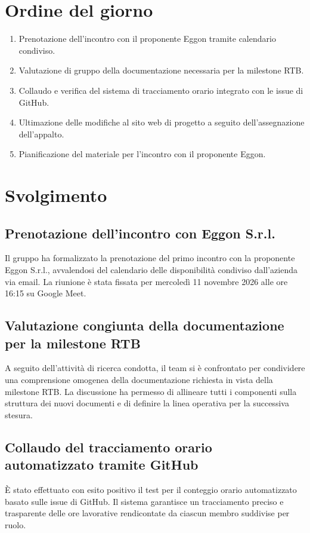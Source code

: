 \documentclass[interno]{gpt}
\begin{document}
\section{Ordine del giorno}
\begin{enumerate}
  \item Prenotazione dell'incontro con il proponente Eggon tramite calendario condiviso.
  \item Valutazione di gruppo della documentazione necessaria per la milestone RTB.
  \item Collaudo e verifica del sistema di tracciamento orario integrato con le issue di GitHub.
  \item Ultimazione delle modifiche al sito web di progetto a seguito dell'assegnazione dell'appalto.
  \item Pianificazione del materiale per l'incontro con il proponente Eggon.
\end{enumerate}

\clearpage

\section{Svolgimento}

\subsection{Prenotazione dell'incontro con Eggon S.r.l.}
Il gruppo ha formalizzato la prenotazione del primo incontro con la proponente Eggon S.r.l., avvalendosi del calendario delle disponibilità condiviso dall'azienda via email. La riunione è stata fissata per mercoledì 11 novembre 2026 alle ore 16:15 su Google Meet.

\subsection{Valutazione congiunta della documentazione per la milestone RTB}
A seguito dell'attività di ricerca condotta, il team si è confrontato per condividere una comprensione omogenea della documentazione richiesta in vista della milestone RTB. La discussione ha permesso di allineare tutti i componenti sulla struttura dei nuovi documenti e di definire la linea operativa per la successiva stesura.

\subsection{Collaudo del tracciamento orario automatizzato tramite GitHub}
È stato effettuato con esito positivo il test per il conteggio orario automatizzato basato sulle issue di GitHub. Il sistema garantisce un tracciamento preciso e trasparente delle ore lavorative rendicontate da ciascun membro suddivise per ruolo.
\end{document}
